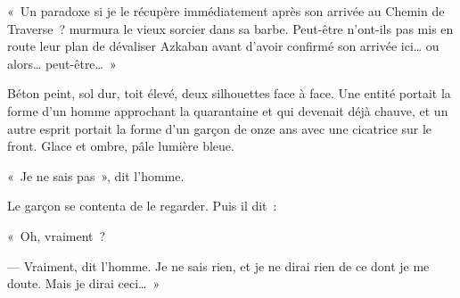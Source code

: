 «~Un paradoxe si je le récupère immédiatement après son arrivée au Chemin de Traverse~? murmura le vieux sorcier dans sa barbe. Peut-être n'ont-ils pas mis en route leur plan de dévaliser Azkaban avant d'avoir confirmé son arrivée ici… ou alors… peut-être…~»

\later

Béton peint, sol dur, toit élevé, deux silhouettes face à face. Une entité portait la forme d'un homme approchant la quarantaine et qui devenait déjà chauve, et un autre esprit portait la forme d'un garçon de onze ans avec une cicatrice sur le front. Glace et ombre, pâle lumière bleue.

«~Je ne sais pas~», dit l'homme.

Le garçon se contenta de le regarder. Puis il dit~:

«~Oh, vraiment~?

--- Vraiment, dit l'homme. Je ne sais rien, et je ne dirai rien de ce dont je me doute. Mais je dirai ceci…~»

